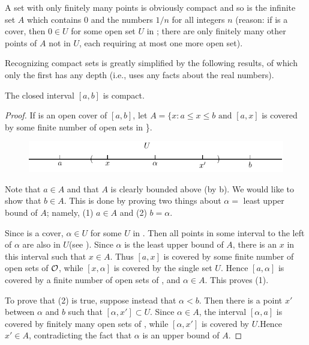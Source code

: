 A set with only finitely many points is obviously compact
and so is the infinite set $A$ which contains 0 and the numbers
$1/n$ for all integers $n$ (reason: if  is a cover, then $0 \in U$ for
some open set $U$ in ; there are only finitely many other points
of $A$ not in $U$, each requiring at most one more open set).

Recognizing compact sets is greatly simplified by the following 
results, of which only the first has any depth (i.e., uses any
facts about the real numbers).

\begin{theorem}
    The closed interval $[a,b]$ is compact.
\end{theorem}

\begin{proof}
    If  is an open cover of $[a,b]$, let 
    $A = \{x:a\le x\le b\text{ and } [a, x]$ is covered by some finite number of open sets in \}.
    \begin{figure}[!htb]
        \centering
        \includegraphics[width=.75\linewidth]{./pics/Fig1-3.pdf}
        \caption{}
        \label{Fig 1-3}
    \end{figure}

    Note that $a\in A$ and that $A$ is clearly bounded above (by b).
    We would like to show that $b\in A$. This is done by proving two things about $\alpha =$ least 
    upper bound of $A$; namely, (1) $a\in A$ and (2) $b=\alpha$.

    Since  is a cover, $\alpha \in U$ for some $U$ in . Then all points in some interval 
    to the left of $\alpha$ are also in $U$(see ). Since $\alpha$ is the least upper bound 
    of $A$, there is an $x$ in this interval such that $x\in A$. Thus $[a, x]$ is covered by some 
    finite number of open sets of $\mathcal{O}$, while $[x, \alpha]$ is covered by the single set $U$. 
    Hence $[a, \alpha]$ is covered by a finite number of open sets of , and $\alpha \in A$.
    This proves (1).

    To prove that (2) is true, suppose instead that $\alpha < b$.
    Then there is a point $x'$ between $\alpha$ and $b$ such that $[\alpha,x'] \subset U$.
    Since $\alpha\in A$, the interval $[\alpha,a]$ is covered by finitely many
    open sets of , while $[\alpha, x']$ is covered by $U$.Hence $x' \in A$,
    contradicting the fact that $\alpha$ is an upper bound of $A$.
\end{proof}

